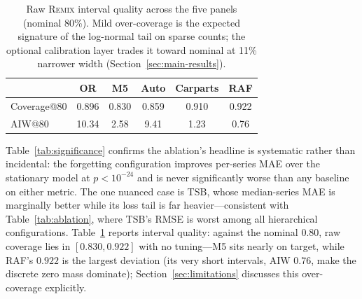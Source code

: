 \documentclass[twocolumn,10pt]{article}
\newcommand{\REMIX}{\textsc{Remix}}
\begin{document}
\begin{table}[t]
\centering
\caption{Raw \REMIX{} interval quality across the five panels (nominal
80\%). Mild over-coverage is the expected signature of the log-normal
tail on sparse counts; the optional calibration layer trades it toward
nominal at 11\% narrower width (Section~\ref{sec:main-results}).}
\label{tab:coverage}
\small
\setlength{\tabcolsep}{4.6pt}
\begin{tabular}{lccccc}
\toprule
 & OR & M5 & Auto & Carparts & RAF\\
\midrule
Coverage@80 & 0.896 & 0.830 & 0.859 & 0.910 & 0.922\\
AIW@80 & 10.34 & 2.58 & 9.41 & 1.23 & 0.76\\
\bottomrule
\end{tabular}
\end{table}

Table~\ref{tab:significance} confirms the ablation's headline is
systematic rather than incidental: the forgetting configuration improves
per-series MAE over the stationary model at $p<10^{-24}$ and is never
significantly worse than any baseline on either metric. The one nuanced
case is TSB, whose median-series MAE is marginally better while its
loss tail is far heavier---consistent with Table~\ref{tab:ablation},
where TSB's RMSE is worst among all hierarchical configurations.
Table~\ref{tab:coverage} reports interval quality: against the nominal
$0.80$, raw coverage lies in $[0.830, 0.922]$ with no tuning---M5 sits
nearly on target, while RAF's $0.922$ is the largest deviation
(its very short intervals, AIW $0.76$, make the discrete zero mass
dominate); Section~\ref{sec:limitations} discusses this over-coverage
explicitly.
\end{document}
